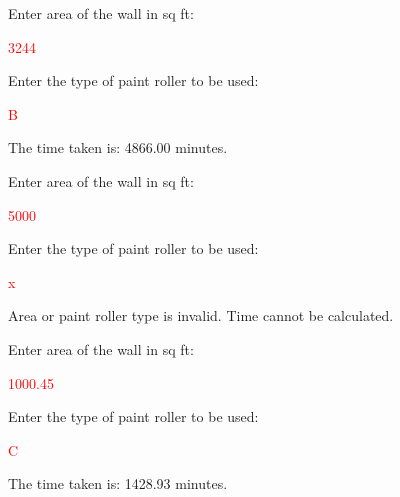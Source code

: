 \begin{sample}
Enter area of the wall in sq ft:

 \textcolor{red}{3244}
 
Enter the type of paint roller to be used:

 \textcolor{red}{B}
 
The time taken is: 4866.00 minutes.

\end{sample}

\begin{sample}
Enter area of the wall in sq ft:

 \textcolor{red}{5000}
 
Enter the type of paint roller to be used:

 \textcolor{red}{x}
 
Area or paint roller type is invalid. Time cannot be calculated.
\end{sample}

\begin{sample}
Enter area of the wall in sq ft:

 \textcolor{red}{1000.45}
 
Enter the type of paint roller to be used:

 \textcolor{red}{C}
 
The time taken is: 1428.93 minutes.

\end{sample}